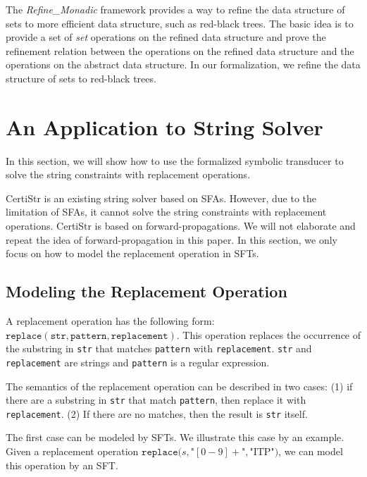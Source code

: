 \documentclass[a4paper,UKenglish,cleveref, autoref, thm-restate]{lipics-v2021}
\begin{document}
The \emph{Refine\_Monadic} framework provides a way to refine the data structure of sets to more efficient data structure, such as red-black trees. The basic idea is to provide a set of \emph{set} operations on the refined data structure and prove the refinement relation between the operations on the refined data structure and the operations on the abstract data structure.
%
In our formalization, we refine the data structure of sets to red-black trees.








\section{An Application to String Solver}
\label{sec-app-str-solver}
In this section, we will show how to use the formalized symbolic transducer to solve the string constraints with replacement operations.

CertiStr is an existing string solver based on SFAs. However, due to the limitation of SFAs, it cannot solve the string constraints with replacement operations. CertiStr is based on forward-propagations. We will not elaborate and repeat the idea of forward-propagation in this paper. In this section, we only focus on how to model the replacement operation in SFTs.


\subsection{Modeling the Replacement Operation}


A replacement operation has the following form: $\texttt{replace}(\texttt{str}, \texttt{pattern}, \texttt{replacement})$. This operation replaces the occurrence of the substring in \texttt{str} that matches \texttt{pattern} with \texttt{replacement}. \texttt{str} and \texttt{replacement} are strings and \texttt{pattern} is a regular expression.

The semantics of the replacement operation can be described in two cases: (1) if there are a substring in \texttt{str} that match \texttt{pattern}, then replace it with \texttt{replacement}. (2) If there are no matches, then the result is \texttt{str} itself.

The first case can be modeled by SFTs. We illustrate this case by an example. Given a replacement operation $\texttt{replace}(s, $"$[0-9]+$"$, $"$\text{ITP}$"$)$, we can model this operation by an SFT.
\end{document}
